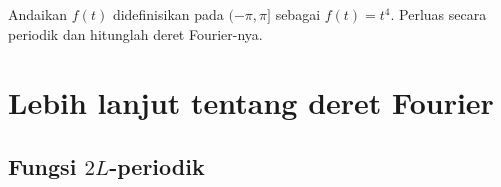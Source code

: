 \begin{exercise}
Andaikan $f(t)$ didefinisikan pada $(-\pi,\pi]$ sebagai $f(t) = t^4$.
Perluas secara periodik dan hitunglah deret Fourier-nya.
\end{exercise}


\sectionnewpage
\section{Lebih lanjut tentang deret Fourier}
\label{moreonfourier:section}




\subsection{Fungsi $2L$-periodik}

